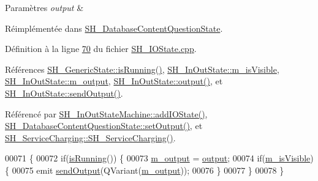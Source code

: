 \begin{DoxyParams}{Paramètres}
{\em output} & \\
\hline
\end{DoxyParams}


Réimplémentée dans \hyperlink{classSH__DatabaseContentQuestionState_aaec6c7f8bc78c6beb7447fc41ffe3875}{S\-H\-\_\-\-Database\-Content\-Question\-State}.



Définition à la ligne \hyperlink{SH__IOState_8cpp_source_l00070}{70} du fichier \hyperlink{SH__IOState_8cpp_source}{S\-H\-\_\-\-I\-O\-State.\-cpp}.



Références \hyperlink{classSH__GenericState_a5f731810dad0cacd28828ccbf1539e4e}{S\-H\-\_\-\-Generic\-State\-::is\-Running()}, \hyperlink{classSH__InOutState_a8fd66b185c9a55f0e84daa97e2acf53a}{S\-H\-\_\-\-In\-Out\-State\-::m\-\_\-is\-Visible}, \hyperlink{classSH__InOutState_ae735e741ce229d2600448d8daa0abc2d}{S\-H\-\_\-\-In\-Out\-State\-::m\-\_\-output}, \hyperlink{classSH__InOutState_a17ed7eaf5e3ed5af80a4f9fe65d5bfd9}{S\-H\-\_\-\-In\-Out\-State\-::output()}, et \hyperlink{classSH__InOutState_a77921c5f42059bc97361f4ff7827da12}{S\-H\-\_\-\-In\-Out\-State\-::send\-Output()}.



Référencé par \hyperlink{classSH__InOutStateMachine_a2528cffddbe6f98c32ebef41423c0118}{S\-H\-\_\-\-In\-Out\-State\-Machine\-::add\-I\-O\-State()}, \hyperlink{classSH__DatabaseContentQuestionState_aaec6c7f8bc78c6beb7447fc41ffe3875}{S\-H\-\_\-\-Database\-Content\-Question\-State\-::set\-Output()}, et \hyperlink{classSH__ServiceCharging_afa5273d046049b1c2b020a6a19a8290b}{S\-H\-\_\-\-Service\-Charging\-::\-S\-H\-\_\-\-Service\-Charging()}.


\begin{DoxyCode}
00071 \{
00072     \textcolor{keywordflow}{if}(\hyperlink{classSH__GenericState_a5f731810dad0cacd28828ccbf1539e4e}{isRunning}()) \{
00073         \hyperlink{classSH__InOutState_ae735e741ce229d2600448d8daa0abc2d}{m\_output} = \hyperlink{classSH__InOutState_a17ed7eaf5e3ed5af80a4f9fe65d5bfd9}{output};
00074         \textcolor{keywordflow}{if}(\hyperlink{classSH__InOutState_a8fd66b185c9a55f0e84daa97e2acf53a}{m\_isVisible}) \{
00075             emit \hyperlink{classSH__InOutState_a77921c5f42059bc97361f4ff7827da12}{sendOutput}(QVariant(\hyperlink{classSH__InOutState_ae735e741ce229d2600448d8daa0abc2d}{m\_output}));
00076         \}
00077     \}
00078 \}
\end{DoxyCode}



